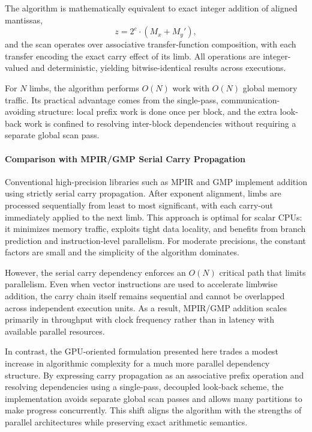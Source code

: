 The algorithm is mathematically equivalent to exact integer addition of aligned
mantissas,
\[
z = 2^e \cdot (M_x + M_y'),
\]
and the scan operates over associative transfer-function composition, with each
transfer encoding the exact carry effect of its limb. All operations are integer-valued and deterministic, yielding
bitwise-identical results across executions.

For $N$ limbs, the algorithm performs $O(N)$ work with $O(N)$ global memory
traffic. Its practical advantage comes from the single-pass,
communication-avoiding structure: local prefix work is done once per block, and
the extra look-back work is confined to resolving inter-block dependencies
without requiring a separate global scan pass.

\paragraph{Comparison with MPIR/GMP Serial Carry Propagation}

Conventional high-precision libraries such as MPIR and GMP implement addition
using strictly serial carry propagation. After exponent alignment, limbs are
processed sequentially from least to most significant, with each carry-out
immediately applied to the next limb. This approach is optimal for scalar CPUs:
it minimizes memory traffic, exploits tight data locality, and benefits from
branch prediction and instruction-level parallelism. For moderate precisions,
the constant factors are small and the simplicity of the algorithm dominates.

However, the serial carry dependency enforces an $O(N)$ critical path that
limits parallelism. Even when vector instructions are used to
accelerate limbwise addition, the carry chain itself remains sequential and
cannot be overlapped across independent execution units. As a result, MPIR/GMP
addition scales primarily in throughput with clock frequency rather than in
latency with available parallel resources.

In contrast, the GPU-oriented formulation presented here trades a modest
increase in algorithmic complexity for a much more parallel dependency
structure. By expressing carry propagation as an associative prefix operation
and resolving dependencies using a single-pass, decoupled look-back scheme, the
implementation avoids separate global scan passes and allows many partitions to
make progress concurrently. This shift aligns the algorithm with the strengths
of parallel architectures while preserving exact arithmetic
semantics.

